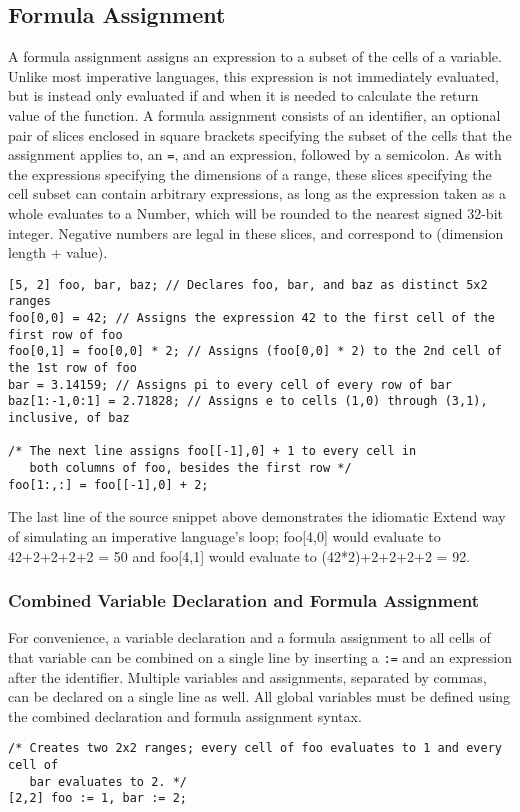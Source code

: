 \subsection{Formula Assignment}
\label{sec:formula}
A formula assignment assigns an expression to a subset of the cells of a variable. Unlike most imperative languages, this expression is not immediately evaluated, but is instead only evaluated if and when it is needed to calculate the return value of the function. A formula assignment consists of an identifier, an optional pair of slices enclosed in square brackets specifying the subset of the cells that the assignment applies to, an \texttt{=}, and an expression, followed by a semicolon. As with the expressions specifying the dimensions of a range, these slices specifying the cell subset can contain arbitrary expressions, as long as the expression taken as a whole evaluates to a Number, which will be rounded to the nearest signed 32-bit integer. Negative numbers are legal in these slices, and correspond to (dimension length + value).
\begin{lstlisting}
[5, 2] foo, bar, baz; // Declares foo, bar, and baz as distinct 5x2 ranges
foo[0,0] = 42; // Assigns the expression 42 to the first cell of the first row of foo
foo[0,1] = foo[0,0] * 2; // Assigns (foo[0,0] * 2) to the 2nd cell of the 1st row of foo
bar = 3.14159; // Assigns pi to every cell of every row of bar
baz[1:-1,0:1] = 2.71828; // Assigns e to cells (1,0) through (3,1), inclusive, of baz

/* The next line assigns foo[[-1],0] + 1 to every cell in
   both columns of foo, besides the first row */
foo[1:,:] = foo[[-1],0] + 2;
\end{lstlisting}
The last line of the source snippet above demonstrates the idiomatic Extend way of simulating an imperative language's loop; foo[4,0] would evaluate to 42+2+2+2+2 = 50 and foo[4,1] would evaluate to (42*2)+2+2+2+2 = 92.
\subsubsection{Combined Variable Declaration and Formula Assignment}
For convenience, a variable declaration and a formula assignment to all cells of that variable can be combined on a single line by inserting a \texttt{:=} and an expression after the identifier. Multiple variables and assignments, separated by commas, can be declared on a single line as well. All global variables must be defined using the combined declaration and formula assignment syntax.
\begin{lstlisting}
/* Creates two 2x2 ranges; every cell of foo evaluates to 1 and every cell of
   bar evaluates to 2. */
[2,2] foo := 1, bar := 2;
\end{lstlisting}
